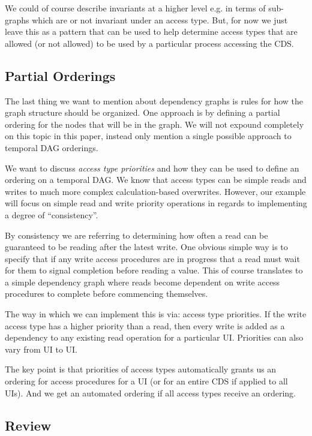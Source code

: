 We could of course describe invariants at a higher level e.g. in terms of sub-graphs which are or not invariant under an access type. But, for now we just leave this as a pattern that can be used to help determine access types that are allowed (or not allowed) to be used by a particular process accessing the CDS.

\subsection{Partial Orderings}

The last thing we want to mention about dependency graphs is rules for how the graph structure should be organized. One approach is by defining a partial ordering for the nodes that will be in the graph. We will not expound completely on this topic in this paper, instead only mention a single possible approach to temporal DAG orderings.

We want to discuss \textit{access type priorities} and how they can be used to define an ordering on a temporal DAG. We know that access types can be simple reads and writes to much more complex calculation-based overwrites. However, our example will focus on simple read and write priority operations in regards to implementing a degree of ``consistency''.

By consistency we are referring to determining how often a read can be guaranteed to be reading after the latest write. One obvious simple way is to specify that if any write access procedures are in progress that a read must wait for them to signal completion before reading a value. This of course translates to a simple dependency graph where reads become dependent on write access procedures to complete before commencing themselves.

The way in which we can implement this is via: access type priorities. If the write access type has a higher priority than a read, then every write is added as a dependency to any existing read operation for a particular UI. Priorities can also vary from UI to UI.

The key point is that priorities of access types automatically grants us an ordering for access procedures for a UI (or for an entire CDS if applied to all UIs). And we get an automated ordering if all access types receive an ordering.

\subsection{Review}

